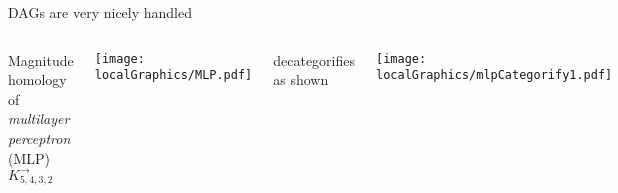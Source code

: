 \documentclass[usenames,dvipsnames,10pt,aspectratio=169]{beamer}
\begin{document}


\begin{frame}{DAGs are very nicely handled}

\begin{columns}
Magnitude homology of \emph{multilayer perceptron} (MLP) $K^\rightarrow_{5,4,3,2}$

\texttt{[image: localGraphics/MLP.pdf]}

decategorifies as shown

\texttt{[image: localGraphics/mlpCategorify1.pdf]}
\end{columns}
\end{frame}
\end{document}
